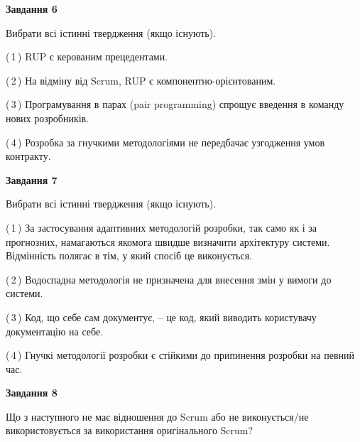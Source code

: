 \documentclass[10pt, ukrainian]{article}
\begin{document}
{\begin {large}
\newpage

{\begin {center}\textbf{Завдання 6}\end {center}}\par
Вибрати всі істинні твердження (якщо існують).\par
\vspace{2mm}



(\,1\,) RUP є керованим прецедентами. %



(\,2\,) На відміну від Scrum, RUP є компонентно-орієнтованим. %



(\,3\,) Програмування в парах (pair programming) спрощує введення в команду нових розробників. %



(\,4\,) Розробка за гнучкими методологіями не передбачає узгодження умов контракту. %


{\begin {center}\textbf{Завдання 7}\end {center}}\par
Вибрати всі істинні твердження (якщо існують).\par
\vspace{2mm}



(\,1\,) За застосування адаптивних методологій розробки, так само як і за прогнозних, намагаються якомога швидше визначити архітектуру системи. Відмінність полягає в тім, у який спосіб це виконується.%



(\,2\,) Водоспадна методологія не призначена для внесення змін у вимоги до системи. %



(\,3\,) Код, що себе сам документує, -- це код, який виводить користувачу документацію на себе. %



(\,4\,) Гнучкі методології розробки є стійкими до припинення розробки на певний час. %


{\begin {center}\textbf{Завдання 8}\end {center}}\par
Що з наступного не має відношення до Scrum або не виконується/не використовується за використання оригінального Scrum?\par
\vspace{2mm}




\end{large}}
\end{document}
